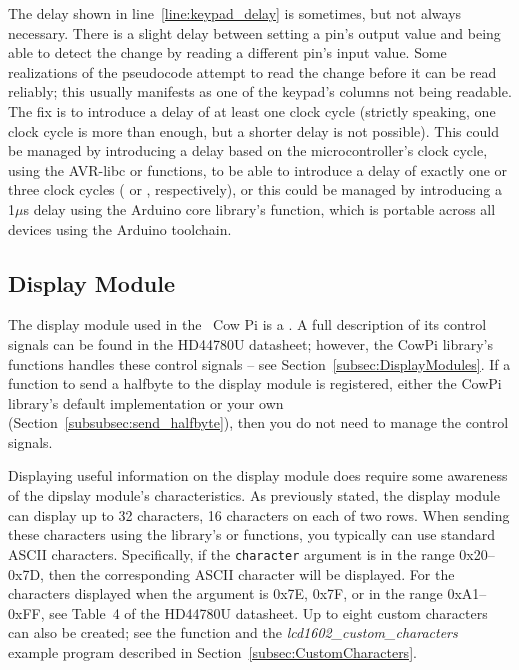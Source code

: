 The delay shown in line~\ref{line:keypad_delay} is sometimes, but not always necessary.
There is a slight delay between setting a pin's output value and being able to detect the change by reading a different pin's input value.
Some realizations of the pseudocode attempt to read the change before it can be read reliably;
this usually manifests as one of the keypad's columns not being readable.
The fix is to introduce a delay of at least one clock cycle (strictly speaking, one clock cycle is more than enough, but a shorter delay is not possible).
This could be managed by introducing a delay based on the microcontroller's clock cycle, using the AVR-libc  or  functions,\cite{avrNOP}\cite{avrDelayBasic} to be able to introduce a delay of exactly one or three clock cycles ( or , respectively),
or this could be managed by introducing a 1$\mu$s delay using the Arduino core library's  function,\cite{arduinoDelay} which is portable across all devices using the Arduino toolchain.

\subsection{Display Module}

The display module used in the \hardwareversion~Cow Pi is a \displaymoduledescription.
A full description of its control signals can be found in the HD44780U datasheet;\cite{lcd1602}
however, the CowPi library's functions handles these control signals -- see Section~\ref{subsec:DisplayModules}.
If a function to send a halfbyte to the display module is registered, either the CowPi library's default implementation or your own (Section~\ref{subsubsec:send_halfbyte}), then you do not need to manage the control signals.

Displaying useful information on the display module does require some awareness of the dipslay module's characteristics.
As previously stated, the display module can display up to 32 characters, 16 characters on each of two rows.
When sending these characters using the library's \hyperlink{function:cowpi_lcd1602_place_character}{} or \hyperlink{function:cowpi_lcd1602_send_character}{} functions, you typically can use standard ASCII characters.
Specifically, if the \lstinline{character} argument is in the range 0x20--0x7D, then the corresponding ASCII character will be displayed.
For the characters displayed when the argument is 0x7E, 0x7F, or in the range 0xA1--0xFF, see Table~4 of the HD44780U datasheet.\cite{lcd1602}
Up to eight custom characters can also be created; see the \hyperlink{function:cowpi_lcd1602_create_character}{} function and the \textit{lcd1602\_custom\_characters} example program described in Section~\ref{subsec:CustomCharacters}.

